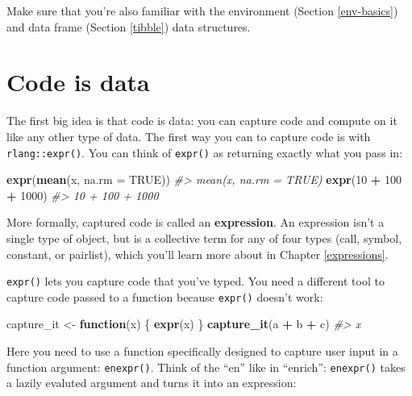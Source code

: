 \documentclass[]{book}
\newenvironment{Shaded}{\begin{snugshade}}{\end{snugshade}}
\newcommand{\CommentTok}[1]{\textcolor[rgb]{0.37,0.37,0.37}{\textit{#1}}}
\newcommand{\ControlFlowTok}[1]{\textcolor[rgb]{0.27,0.27,0.27}{\textbf{#1}}}
\newcommand{\DataTypeTok}[1]{\textcolor[rgb]{0.27,0.27,0.27}{#1}}
\newcommand{\DecValTok}[1]{\textcolor[rgb]{0.06,0.06,0.06}{#1}}
\newcommand{\KeywordTok}[1]{\textcolor[rgb]{0.27,0.27,0.27}{\textbf{#1}}}
\newcommand{\NormalTok}[1]{#1}
\newcommand{\OperatorTok}[1]{\textcolor[rgb]{0.43,0.43,0.43}{\textbf{#1}}}
\newcommand{\OtherTok}[1]{\textcolor[rgb]{0.37,0.37,0.37}{#1}}
\newcommand{\StringTok}[1]{\textcolor[rgb]{0.5,0.5,0.5}{#1}}
\begin{document}
Make sure that you're also familiar with the environment (Section \ref{env-basics}) and data frame (Section \ref{tibble}) data structures.

\hypertarget{code-data}{%
\section{Code is data}\label{code-data}}

The first big idea is that code is data: you can capture code and compute on it like any other type of data. The first way you can to capture code is with \texttt{rlang::expr()}. You can think of \texttt{expr()} as returning exactly what you pass in:

\begin{Shaded}
\begin{Highlighting}[]
\KeywordTok{expr}\NormalTok{(}\KeywordTok{mean}\NormalTok{(x, }\DataTypeTok{na.rm =} \OtherTok{TRUE}\NormalTok{))}
\CommentTok{#> mean(x, na.rm = TRUE)}
\KeywordTok{expr}\NormalTok{(}\DecValTok{10} \OperatorTok{+}\StringTok{ }\DecValTok{100} \OperatorTok{+}\StringTok{ }\DecValTok{1000}\NormalTok{)}
\CommentTok{#> 10 + 100 + 1000}
\end{Highlighting}
\end{Shaded}

More formally, captured code is called an \textbf{expression}. An expression isn't a single type of object, but is a collective term for any of four types (call, symbol, constant, or pairlist), which you'll learn more about in Chapter \ref{expressions}.

\texttt{expr()} lets you capture code that you've typed. You need a different tool to capture code passed to a function because \texttt{expr()} doesn't work:

\begin{Shaded}
\begin{Highlighting}[]
\NormalTok{capture_it <-}\StringTok{ }\ControlFlowTok{function}\NormalTok{(x) \{}
  \KeywordTok{expr}\NormalTok{(x)}
\NormalTok{\}}
\KeywordTok{capture_it}\NormalTok{(a }\OperatorTok{+}\StringTok{ }\NormalTok{b }\OperatorTok{+}\StringTok{ }\NormalTok{c)}
\CommentTok{#> x}
\end{Highlighting}
\end{Shaded}

Here you need to use a function specifically designed to capture user input in a function argument: \texttt{enexpr()}. Think of the ``en'' like in ``enrich'': \texttt{enexpr()} takes a lazily evaluted argument and turns it into an expression:
\end{document}
